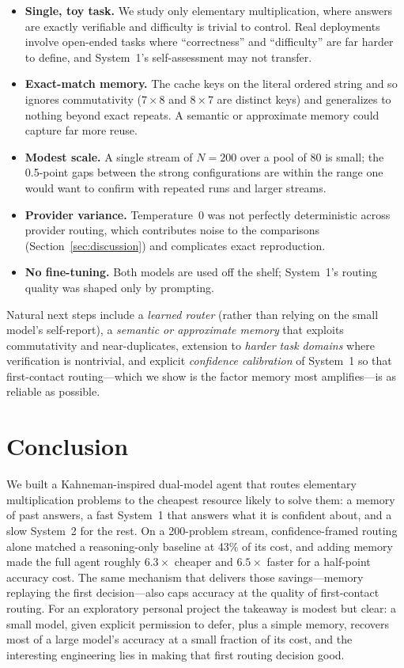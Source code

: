 \documentclass[11pt]{article}
\newcommand{\sysone}{System~1}
\newcommand{\systwo}{System~2}
\begin{document}
\begin{itemize}
  \item \textbf{Single, toy task.} We study only elementary multiplication, where
        answers are exactly verifiable and difficulty is trivial to control. Real
        deployments involve open-ended tasks where ``correctness'' and
        ``difficulty'' are far harder to define, and \sysone's self-assessment
        may not transfer.
  \item \textbf{Exact-match memory.} The cache keys on the literal ordered string
        and so ignores commutativity ($7\times8$ and $8\times7$ are distinct
        keys) and generalizes to nothing beyond exact repeats. A semantic or
        approximate memory could capture far more reuse.
  \item \textbf{Modest scale.} A single stream of $N=200$ over a pool of 80 is
        small; the 0.5-point gaps between the strong configurations are within the
        range one would want to confirm with repeated runs and larger streams.
  \item \textbf{Provider variance.} Temperature~0 was not perfectly
        deterministic across provider routing, which contributes noise to the
        comparisons (Section~\ref{sec:discussion}) and complicates exact
        reproduction.
  \item \textbf{No fine-tuning.} Both models are used off the shelf; \sysone's
        routing quality was shaped only by prompting.
\end{itemize}

Natural next steps include a \emph{learned router} (rather than relying on the
small model's self-report), a \emph{semantic or approximate memory} that exploits
commutativity and near-duplicates, extension to \emph{harder task domains} where
verification is nontrivial, and explicit \emph{confidence calibration} of
\sysone{} so that first-contact routing---which we show is the factor memory most
amplifies---is as reliable as possible.

\section{Conclusion}
\label{sec:conclusion}

We built a Kahneman-inspired dual-model agent that routes elementary
multiplication problems to the cheapest resource likely to solve them: a memory
of past answers, a fast \sysone{} that answers what it is confident about, and a
slow \systwo{} for the rest. On a 200-problem stream, confidence-framed routing
alone matched a reasoning-only baseline at 43\% of its cost, and adding memory
made the full agent roughly $6.3\times$ cheaper and $6.5\times$ faster for a
half-point accuracy cost. The same mechanism that delivers those savings---memory
replaying the first decision---also caps accuracy at the quality of first-contact
routing. For an exploratory personal project the takeaway is modest but
clear: a small model, given explicit permission to defer, plus a simple memory,
recovers most of a large model's accuracy at a small fraction of its cost, and
the interesting engineering lies in making that first routing decision good.
\end{document}
